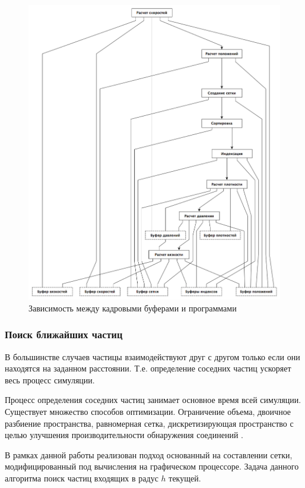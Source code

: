\begin{figure}
\begin{center}
  \includegraphics[scale=0.4]{Figures/buffers}
\end{center}
\caption{Зависимость между кадровыми буферами и программами}
\label{fig:buffers}
\end{figure}


\subsubsection{Поиск ближайших частиц}

В большинстве случаев частицы взаимодействуют друг с другом только если они находятся на 
заданном расстоянии. Т.е. определение соседних частиц ускоряет весь процесс симуляции.

Процесс определения соседних частиц занимает основное время всей симуляции. Существует
множество способов оптимизации. Ограничение объема, двоичное разбиение пространства, 
равномерная сетка, дискретизирующая пространство с целью улучшения производительности 
обнаружения соединений \cite{neisearch}.

В рамках данной работы реализован подход основанный на составлении сетки, модифицированный
под вычисления на графическом процессоре. Задача данного алгоритма поиск частиц входящих в 
радус $h$ текущей.

